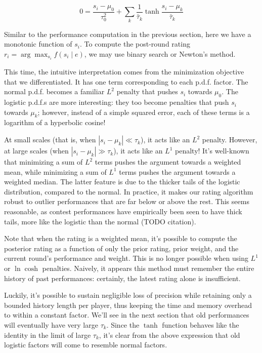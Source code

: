 \documentclass{article}
\begin{document}
\[
0 = \frac{s_i-\mu_0}{\tau_0^2} + \sum_k \frac{1}{\bar\tau_k} \tanh \frac {s_i-\mu_k} {\bar\tau_k}
\]

Similar to the performance computation in the previous section, here we have a monotonic function of $s_i$. To compute the post-round rating $r_i = \arg\max_{s_i} f(s_i \mid e)$, we may use binary search or Newton's method.

This time, the intuitive interpretation comes from the minimization objective that we differentiated. It has one term corresponding to each p.d.f. factor. The normal p.d.f. becomes a familiar $L^2$ penalty that pushes $s_i$ towards $\mu_0$. The logistic p.d.f.s are more interesting: they too become penalties that push $s_i$ towards $\mu_k$; however, instead of a simple squared error, each of these terms is a logarithm of a hyperbolic cosine!

At small scales (that is, when $|s_i-\mu_k| \ll \tau_k$), it acts like an $L^2$ penalty. However, at large scales (when $|s_i-\mu_k| \gg \tau_k$), it acts like an $L^1$ penalty! It's well-known that minimizing a sum of $L^2$ terms pushes the argument towards a weighted mean, while minimizing a sum of $L^1$ terms pushes the argument towards a weighted median. The latter feature is due to the thicker tails of the logistic distribution, compared to the normal. In practice, it makes our rating algorithm robust to outlier performances that are far below or above the rest. This seems reasonable, as contest performances have empirically been seen to have thick tails, more like the logistic than the normal (TODO citation).

Note that when the rating is a weighted mean, it's possible to compute the posterior rating as a function of only the prior rating, prior weight, and the current round's performance and weight. This is no longer possible when using $L^1$ or $\ln\cosh$ penalties. Naively, it appears this method must remember the entire history of past performances: certainly, the latest rating alone is insufficient.

Luckily, it's possible to sustain negligible loss of precision while retaining only a bounded history length per player, thus keeping the time and memory overhead to within a constant factor. We'll see in the next section that old performances will eventually have very large $\tau_k$. Since the $\tanh$ function behaves like the identity in the limit of large $\tau_k$, it's clear from the above expression that old logistic factors will come to resemble normal factors.
\end{document}
